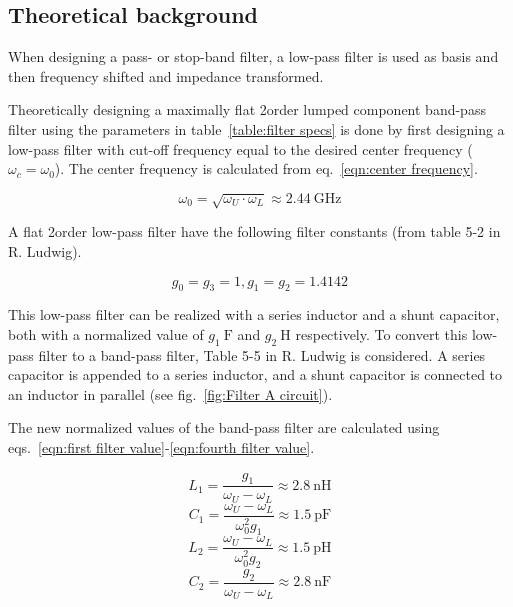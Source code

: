 \documentclass[report.tex]{subfiles}
\begin{document}
\subsection{Theoretical background}
When designing a pass- or stop-band filter, a low-pass filter is used as basis and then frequency shifted and impedance transformed. 

Theoretically designing a maximally flat 2\nd order lumped component band-pass filter using the parameters in table~\ref{table:filter specs} is done by first designing a low-pass filter with cut-off frequency equal to the desired center frequency ($\omega_c=\omega_0$). The center frequency is calculated from eq.~\ref{eqn:center frequency}.

\begin{equation}
    \omega_0 = \sqrt{\omega_U \cdot \omega_L} \approx 2.44~\text{GHz}
    \label{eqn:center frequency}
\end{equation}

A flat 2\nd order low-pass filter have the following filter constants (from table 5-2 in R. Ludwig).

\begin{equation*}
    g_0=g_3=1, g_1=g_2=1.4142
\end{equation*}

This low-pass filter can be realized with a series inductor and a shunt capacitor, both with a normalized value of $g_1~\text{F}$ and $g_2~\text{H}$ respectively. To convert this low-pass filter to a band-pass filter, Table 5-5 in R. Ludwig is considered. A series capacitor is appended to a series inductor, and a shunt capacitor is connected to an inductor in parallel (see fig.~\ref{fig:Filter A circuit}).

The new normalized values of the band-pass filter are calculated using eqs.~\ref{eqn:first filter value}-\ref{eqn:fourth filter value}.

\begin{equation}
    \label{eqn:first filter value}
    L_1=\frac{g_1}{\omega_U-\omega_L} \approx 2.8~\text{nH}
\end{equation}
\begin{equation}
    C_1=\frac{\omega_U-\omega_L}{\omega_0^2 g_1} \approx 1.5~\text{pF}
\end{equation}
\begin{equation}
    L_2=\frac{\omega_U-\omega_L}{\omega_0^2 g_2} \approx 1.5~\text{pH}
\end{equation}
\begin{equation}
    \label{eqn:fourth filter value}
    C_2=\frac{g_2}{\omega_U-\omega_L} \approx 2.8~\text{nF}
\end{equation}
\end{document}
